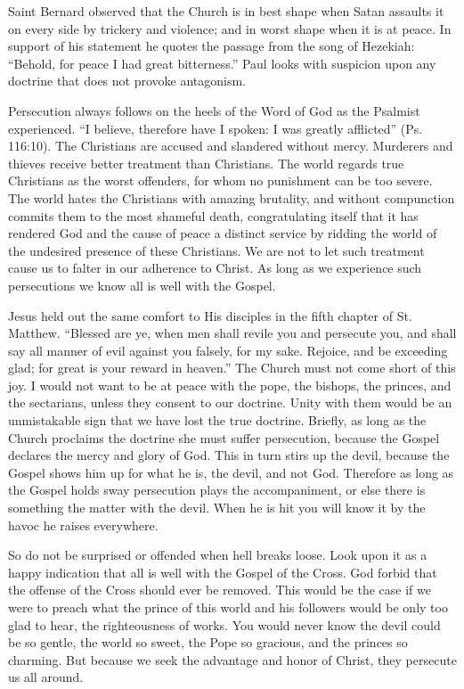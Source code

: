 Saint Bernard observed that the Church is in best shape when Satan assaults it on every side by trickery and violence; and in worst shape when it is at peace. In support of his statement he quotes the passage from the song of Hezekiah: “Behold, for peace I had great bitterness.” Paul looks with suspicion upon any doctrine that does not provoke antagonism.

Persecution always follows on the heels of the Word of God as the Psalmist experienced. “I believe, therefore have I spoken: I was greatly afflicted” (Ps. 116:10). The Christians are accused and slandered without mercy. Murderers and thieves receive better treatment than Christians. The world regards true Christians as the worst offenders, for whom no punishment can be too severe. The world hates the Christians with amazing brutality, and without compunction commits them to the most shameful death, congratulating itself that it has rendered God and the cause of peace a distinct service by ridding the world of the undesired presence of these Christians. We are not to let such treatment cause us to falter in our adherence to Christ. As long as we experience such persecutions we know all is well with the Gospel.

Jesus held out the same comfort to His disciples in the fifth chapter of St. Matthew. “Blessed are ye, when men shall revile you and persecute you, and shall say all manner of evil against you falsely, for my sake. Rejoice, and be exceeding glad; for great is your reward in heaven.” The Church must not come short of this joy. I would not want to be at peace with the pope, the bishops, the princes, and the sectarians, unless they consent to our doctrine. Unity with them would be an unmistakable sign that we have lost the true doctrine. Briefly, as long as the Church proclaims the doctrine she must suffer persecution, because the Gospel declares the mercy and glory of God. This in turn stirs up the devil, because the Gospel shows him up for what he is, the devil, and not God. Therefore as long as the Gospel holds sway persecution plays the accompaniment, or else there is something the matter with the devil. When he is hit you will know it by the havoc he raises everywhere.

So do not be surprised or offended when hell breaks loose. Look upon it as a happy indication that all is well with the Gospel of the Cross. God forbid that the offense of the Cross should ever be removed. This would be the case if we were to preach what the prince of this world and his followers would be only too glad to hear, the righteousness of works. You would never know the devil could be so gentle, the world so sweet, the Pope so gracious, and the princes so charming. But because we seek the advantage and honor of Christ, they persecute us all around.

